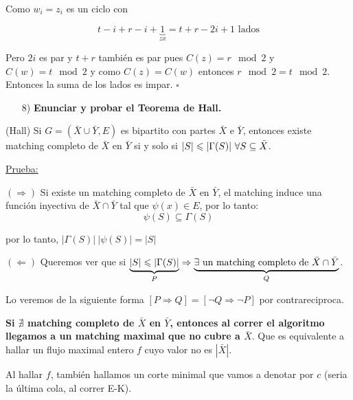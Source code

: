 \documentclass[12pt,a4paper]{article}
\begin{document}
Como $w_{i} = z_{i}$ es un ciclo con

$$t - i + r - i + \underbrace{1}_{zx} = t + r - 2i + 1 \,\, \text{lados}$$

Pero $2i$ es par y $t+r$ también es par pues $C(z) = r \mod 2$ y $C(w) = t \mod 2$ 
y como $C(z) = C(w)$ entonces $r \mod 2 = t \mod 2$. Entonces la suma de los 
lados es impar. $\square$

\begin{itemize}
    \item [8)] \textbf{Enunciar y probar el Teorema de Hall.}
    \label{dem:hall}
\end{itemize}

\begin{teorema} (Hall) Si $G = (\bar{X} \cup \bar{Y}, E)$ es bipartito con partes 
    $\bar{X}$ e $\bar{Y}$, entonces existe matching completo de $\bar{X}$ en $\bar{Y}$
    si y solo si $|S| \leqslant |\Gamma(S)| \,\, \forall S \subseteq \bar{X}$.
\end{teorema}

\underline{Prueba:}
\medskip

$(\Rightarrow)$ Si existe un matching completo de $\bar{X}$ en $\bar{Y}$, el matching 
induce una función inyectiva de $\bar{X} \cap \bar{Y}$ tal que $\psi(x) \in E$, 
por lo tanto:
$$\psi(S) \subseteq \Gamma(S)$$

por lo tanto, $|\Gamma(S)| \> |\psi(S)| = |S|$
\medskip

$(\Leftarrow)$ Queremos ver que si $\underbrace{|S| \leqslant |\Gamma(S)|}_{P} \Rightarrow \underbrace{\exists\,\, \text{un matching completo de $\bar{X} \cap \bar{Y}$}}_{Q}$.
\medskip

Lo veremos de la siguiente forma $[P \Rightarrow Q] = [\neg Q \Rightarrow \neg P]$ 
por contrareciproca.
\medskip

\textbf{Si $\nexists$ matching completo de $\bar{X}$ en $\bar{Y}$, entonces al 
correr el algoritmo llegamos a un matching maximal que no cubre a $\bar{X}$}. Que 
es equivalente a hallar un flujo maximal entero $f$ cuyo valor no es $|\bar{X}|$.
\medskip

Al hallar $f$, también hallamos un corte minimal que vamos a denotar por $c$ (seria 
la última cola, al correr E-K).
\medskip
\end{document}
